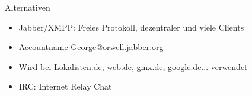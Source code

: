 \begin{frame}{Alternativen}
	\begin{itemize}
		\item Jabber/XMPP: Freies Protokoll, dezentraler und viele Clients
		\item Accountname George@orwell.jabber.org
		\item Wird bei Lokalisten.de, web.de, gmx.de, google.de... verwendet
		\item IRC: Internet Relay Chat
	\end{itemize}
\end{frame}

